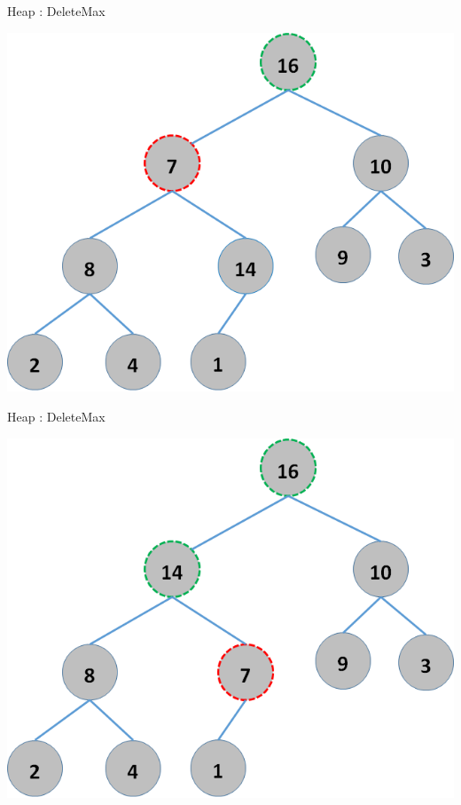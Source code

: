 \documentclass{beamer}
\begin{document}
\begin{frame}{Heap : DeleteMax}
    \begin{center}
        \includegraphics[scale=0.5]{heapDelete4.png}
    \end{center}
\end{frame}



\begin{frame}{Heap : DeleteMax}
    \begin{center}
        \includegraphics[scale=0.5]{heapDelete5.png}
    \end{center}
\end{frame}
\end{document}
